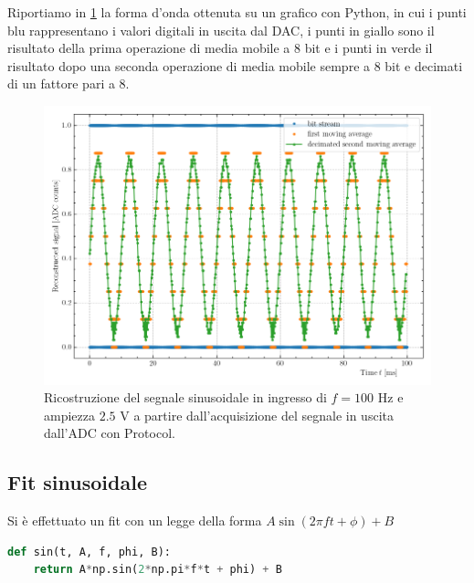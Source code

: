 \documentclass[10pt, a4paper, italian]{article}
\begin{document}
Riportiamo in \cref{fig: sin100hzpy} la forma d'onda ottenuta su un grafico
con Python, in cui i punti blu rappresentano i valori digitali in uscita dal
DAC, i punti in giallo sono il risultato della prima operazione di media
mobile a 8 bit e i punti in verde il risultato dopo una seconda operazione di
media mobile sempre a 8 bit e decimati di un fattore pari a 8.
\begin{figure}[htbp]
    \centering
	\includegraphics[width=\textwidth]{recsin}
    \caption{Ricostruzione del segnale sinusoidale in ingresso di $f = 100$
    Hz e ampiezza $2.5$ V a partire dall'acquisizione del segnale in uscita
    dall'ADC con Protocol.
    \label{fig: sin100hzpy}}
\end{figure}

\subsection{Fit sinusoidale}\label{sbs: sinfit}
Si è effettuato un fit con un legge della forma $A\sin(2\pi f t + \phi) + B$
\begin{lstlisting}[language=Python]
def sin(t, A, f, phi, B):
    return A*np.sin(2*np.pi*f*t + phi) + B
\end{lstlisting}
\end{document}
